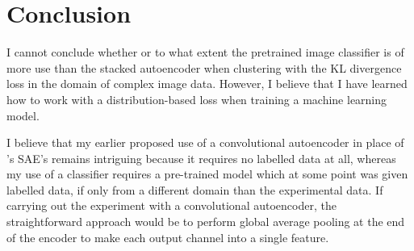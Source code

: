 \section{Conclusion}

I cannot conclude whether or to what extent the pretrained image classifier is of more use than the stacked autoencoder when clustering with the KL divergence loss in the domain of complex image data. However, I believe that I have learned how to work with a distribution-based loss when training a machine learning model.

I believe that my earlier proposed use of a convolutional autoencoder in place of \cite{xie2016unsupervised}'s SAE's remains intriguing because it requires no labelled data at all, whereas my use of a classifier requires a pre-trained model which at some point was given labelled data, if only from a different domain than the experimental data. If carrying out the experiment with a convolutional autoencoder, the straightforward approach would be to perform global average pooling at the end of the encoder to make each output channel into a single feature.
